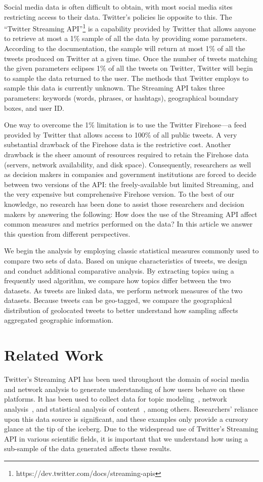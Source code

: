 \documentclass[letterpaper]{article}
\begin{document}
Social media data is often difficult to obtain, with most social media sites restricting access to their data. Twitter's policies lie opposite to this. The ``Twitter Streaming API''\footnote{https://dev.twitter.com/docs/streaming-apis} is a capability provided by Twitter that allows anyone to retrieve at most a 1\% sample of all the data by providing some parameters. According to the documentation, the sample will return at most 1\% of all the tweets produced on Twitter at a given time. Once the number of tweets matching the given parameters eclipses 1\% of all the tweets on Twitter, Twitter will begin to sample the data returned to the user. The methods that Twitter employs to sample this data is currently unknown. The Streaming API takes three parameters: keywords (words, phrases, or hashtags), geographical boundary boxes, and user ID. 

One way to overcome the 1\% limitation is to use the Twitter Firehose---a feed provided by Twitter that allows access to 100\% of all public tweets. A very substantial drawback of the Firehose data is the restrictive cost. Another drawback is the sheer amount of resources required to retain the Firehose data (servers, network availability, and disk space). Consequently, researchers as well as decision makers in companies and government institutions are forced to decide between two versions of the API: the freely-available but limited Streaming, and the very expensive but comprehensive Firehose version. To the best of our knowledge, no research has been done to assist those researchers and decision makers by answering the following: How does the use of the Streaming API affect common measures and metrics performed on the data? In this article we answer this question from different perspectives. 

We begin the analysis by employing classic statistical measures commonly used to compare two sets of data. Based on unique characteristics of tweets, we design and conduct additional comparative analysis. By extracting topics using a frequently used algorithm, we compare how topics differ between the two datasets. As tweets are linked data, we perform network measures of the two datasets. Because tweets can be geo-tagged, we compare the geographical distribution of geolocated tweets to better understand how sampling affects aggregated geographic information.

\section{Related Work}
Twitter's Streaming API has been used throughout the domain of social media and network analysis to generate understanding of how users behave on these platforms. It has been used to collect data for topic modeling~\cite{Hong-Davi10,Pozd-11}, network analysis~\cite{Sofe12}, and statistical analysis of content~\cite{Math10}, among others. Researchers' reliance upon this data source is significant, and these examples only provide a cursory glance at the tip of the iceberg. Due to the widespread use of Twitter's Streaming API in various scientific fields, it is important that we understand how using a sub-sample of the data generated affects these results.
\end{document}
